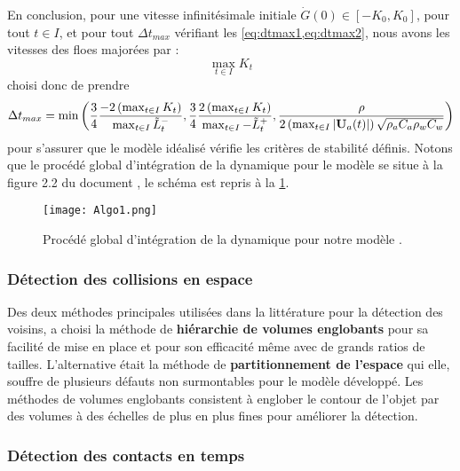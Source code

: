 En conclusion, pour une vitesse infinitésimale initiale $\dot{G}(0) \in [-K_0, K_0]$, pour tout $t \in I$, et pour tout $\Delta t_{max}$ vérifiant les \cref{eq:dtmax1,eq:dtmax2}, nous avons les vitesses des floes majorées par :
$$
\max_{t \in I}{K_t}
$$
\citeauthor{rabatel2015thesis} choisi donc de prendre 
$$
\Delta t_{max} = \min{ \left( \frac{3}{4} \frac{ -2 \left( \max_{t \in I}{K_t} \right)}{ \max_{t \in I}{\tilde{L}_t^{-}}}, \frac{3}{4} \frac{2 \left( \max_{t \in I}{K_t} \right) }{ \max_{t \in I}{-\tilde{L}_t^{+}}}, \frac{\rho}{2 \left(  \max_{t \in I}{  \vert \bm{\mathrm{U}}_a(t) \vert } \right)  \sqrt{\rho_a C_a \rho_w C_w}} \right)}
$$
pour s'assurer que le modèle idéalisé vérifie les critères de stabilité définis. 
Notons que le procédé global d’intégration de la dynamique pour le modèle se situe à la figure 2.2 du document \parencite[p.60]{rabatel2015thesis}, le schéma est repris à la \cref{fig:Algo1}.

\begin{figure}[!ht]
    \centering
    \texttt{[image: Algo1.png]}
    \caption{Procédé global d’intégration de la dynamique pour notre modèle \parencite[p.60]{rabatel2015thesis}.}
    \label{fig:Algo1}
\end{figure}


\subsubsection{Détection des collisions en espace}

Des deux méthodes principales utilisées dans la littérature pour la détection des voisins, \citeauthor{rabatel2015thesis} a choisi la méthode de \textbf{hiérarchie de volumes englobants} pour sa facilité de mise en place et pour son efficacité même avec de grands ratios de tailles. L'alternative était la méthode de \textbf{partitionnement de l'espace} qui elle, souffre de plusieurs défauts non surmontables pour le modèle développé. Les méthodes de volumes englobants consistent à englober le contour de l’objet par des volumes à des échelles de plus en plus fines pour améliorer la détection.

\subsubsection{Détection des contacts en temps}

